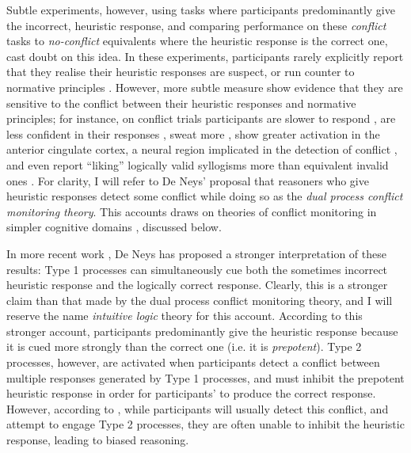 Subtle experiments, however,
using tasks where participants predominantly give
the incorrect, heuristic response,
and comparing performance on these \emph{conflict} tasks
to \emph{no-conflict} equivalents where
the heuristic response is the correct one, cast doubt on this idea.
In these experiments, participants rarely
explicitly report that they realise their heuristic responses
are suspect, or run counter to normative principles \citep{DeNeys2008}.
However, more subtle measure show evidence that
they are sensitive to the conflict between
their heuristic responses and normative principles;
for instance, on conflict trials participants
are slower to respond \citep{DeNeys2008a},
are less confident in their responses \citep{DeNeys2011b, DeNeys2013a},
sweat more \citep{DeNeys2010},
show greater activation in the anterior cingulate cortex,
a neural region implicated in the detection of conflict \citep{DeNeys2008a},
and even report ``liking'' logically valid syllogisms
more than equivalent invalid ones \citep{Morsanyi2012}.
For clarity, I will refer to De Neys' \citep[e.g.][]{DeNeys2008a} proposal
that reasoners who give heuristic responses
detect some conflict while doing so
as the \emph{dual process conflict monitoring theory}.
This accounts draws on theories of conflict monitoring
in simpler cognitive domains \citep{Botvinick2001},
discussed below.

In more recent work \citep[i.e.][]{DeNeys2012, DeNeys2014a},
De Neys has proposed a stronger interpretation of these results:
Type 1 processes can simultaneously cue
both the sometimes incorrect heuristic response
and the logically correct response.
Clearly, this is a stronger claim than that made by
the dual process conflict monitoring theory,
and I will reserve the name \emph{intuitive logic} theory for this account.
According to this stronger account,
participants predominantly give the heuristic response
because it is cued more strongly than the correct one (i.e. it is \emph{prepotent}).
Type 2 processes, however, are activated when
participants detect a conflict between
multiple responses generated by Type 1 processes,
and must inhibit the prepotent heuristic response
in order for participants' to produce the correct response.
However, according to \citet{DeNeys2013},
while participants will usually detect this conflict,
and attempt to engage Type 2 processes,
they are often unable to inhibit the heuristic response,
leading to biased reasoning.

